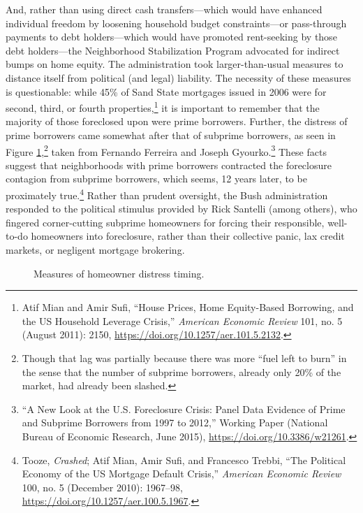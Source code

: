 \documentclass[12pt,oneside]{psthesis}
\begin{document}
And, rather than using direct cash transfers---which would have enhanced individual freedom by loosening household budget constraints---or pass-through payments to debt holders---which would have promoted rent-seeking by those debt holders---the Neighborhood Stabilization Program advocated for indirect bumps on home equity.
The administration took larger-than-usual measures to distance itself from political (and legal) liability.
The necessity of these measures is questionable: while 45\% of Sand State mortgages issued in 2006 were for second, third, or fourth properties,\footnote{Atif Mian and Amir Sufi, ``House Prices, Home Equity-Based Borrowing, and the US Household Leverage Crisis,'' \emph{American Economic Review} 101, no. 5 (August 2011): 2150, \url{https://doi.org/10.1257/aer.101.5.2132}.} it is important to remember that the majority of those foreclosed upon were prime borrowers.
Further, the distress of prime borrowers came somewhat after that of subprime borrowers, as seen in Figure \ref{fig:distress},\footnote{Though that lag was partially because there was more ``fuel left to burn'' in the sense that the number of subprime borrowers, already only 20\% of the market, had already been slashed.} taken from Fernando Ferreira and Joseph Gyourko.\footnote{``A New Look at the U.S. Foreclosure Crisis: Panel Data Evidence of Prime and Subprime Borrowers from 1997 to 2012,'' Working Paper (National Bureau of Economic Research, June 2015), \url{https://doi.org/10.3386/w21261}.}
These facts suggest that neighborhoods with prime borrowers contracted the foreclosure contagion from subprime borrowers, which seems, 12 years later, to be proximately true.\footnote{Tooze, \emph{Crashed}; Atif Mian, Amir Sufi, and Francesco Trebbi, ``The Political Economy of the US Mortgage Default Crisis,'' \emph{American Economic Review} 100, no. 5 (December 2010): 1967--98, \url{https://doi.org/10.1257/aer.100.5.1967}.}
Rather than prudent oversight, the Bush administration responded to the political stimulus provided by Rick Santelli (among others), who fingered corner-cutting subprime homeowners for forcing their responsible, well-to-do homeowners into foreclosure, rather than their collective panic, lax credit markets, or negligent mortgage brokering.
\begin{figure}

{\centering {}

}

\caption{Measures of homeowner distress timing.}\label{fig:distress}
\end{figure}
\end{document}
